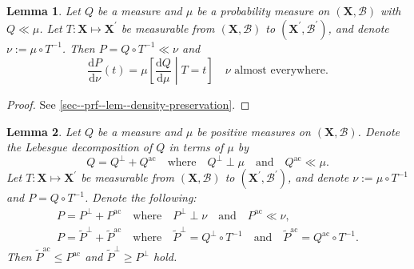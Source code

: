 \documentclass[12pt]{article}
\let\Cref\autoref
\theoremstyle{definition}
\theoremstyle{plain}
\newtheorem{lemma}{Lemma}
\begin{document}
\begin{lemma}
\label{lem--density-preservation}
Let \(Q\) be a measure and \(\mu\) be a probability measure on \((\mathbf{X},
\mathcal{B})\) with \(Q \ll \mu\).
Let \(T : \mathbf{X} \mapsto \mathbf{X}^{\prime}\) be measurable from
\((\mathbf{X}, \mathcal{B})\) to \(\left( \mathbf{X}^{\prime},
\mathcal{B}^{\prime} \right)\), and denote \(\nu := \mu \circ T^{- 1}\).
Then \(P = Q \circ T^{- 1} \ll \nu\) and
\begin{equation}
  \frac{\mathrm{d} P}{\mathrm{d} \nu} (t) = \mu \left[ \frac{\mathrm{d}
  Q}{\mathrm{d} \mu} \middle| T = t \right] \quad \nu \text{ almost everywhere}.
  \label{eqn--density-preservation}
\end{equation}
\end{lemma}

\begin{proof}
See \Cref{sec--prf--lem--density-preservation}.
\end{proof}

\begin{lemma}
\label{lem--leb-decomp-pseudo-ineqs}
Let \(Q\) be a measure and \(\mu\) be positive measures on \((\mathbf{X},
\mathcal{B})\).
Denote the Lebesgue decomposition of \(Q\) in terms of \(\mu\) by
\begin{equation*}
  Q = Q^{\perp} + Q^{\mathrm{ac}} \quad \text{where} \quad Q^{\perp} \perp \mu
  \quad \text{and} \quad Q^{\mathrm{ac}} \ll \mu.
\end{equation*}
Let \(T : \mathbf{X} \mapsto \mathbf{X}^{\prime}\) be measurable from
\((\mathbf{X}, \mathcal{B})\) to \(\left( \mathbf{X}^{\prime},
\mathcal{B}^{\prime} \right)\), and denote \(\nu := \mu \circ T^{- 1}\) and
\(P = Q \circ T^{- 1}\).
Denote the following:
\begin{equation*}
  \begin{gathered}
    P = P^{\perp} + P^{\mathrm{ac}} \quad \text{where} \quad P^{\perp} \perp \nu
    \quad \text{and} \quad P^{\mathrm{ac}} \ll \nu, \\
    P = \tilde{P}^{\perp} + \tilde{P}^{\mathrm{ac}}
    \quad \text{where} \quad
    \tilde{P}^{\perp} = Q^{\perp} \circ T^{- 1} \quad \text{and} \quad
    \tilde{P}^{\mathrm{ac}} = Q^{\mathrm{ac}} \circ T^{- 1}.
  \end{gathered}
\end{equation*}
Then \(\tilde{P}^{\mathrm{ac}} \leq P^{\mathrm{ac}}\) and \(\tilde{P}^{\perp}
\geq P^{\perp}\) hold.
\end{lemma}
\end{document}
